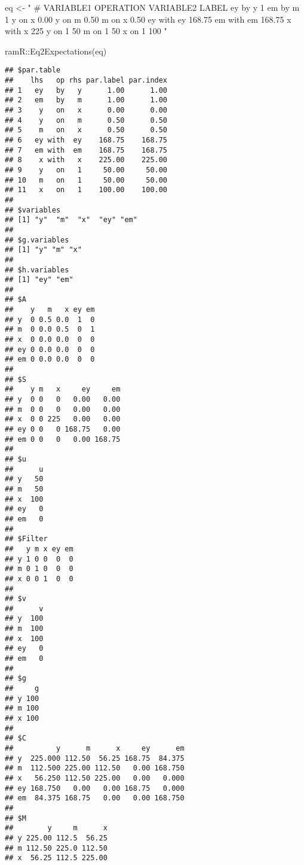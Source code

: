 \documentclass[
]{book}
\newenvironment{Shaded}{\begin{snugshade}}{\end{snugshade}}
\newcommand{\FunctionTok}[1]{\textcolor[rgb]{0.00,0.00,0.00}{#1}}
\newcommand{\NormalTok}[1]{#1}
\newcommand{\OtherTok}[1]{\textcolor[rgb]{0.56,0.35,0.01}{#1}}
\newcommand{\SpecialCharTok}[1]{\textcolor[rgb]{0.00,0.00,0.00}{#1}}
\newcommand{\StringTok}[1]{\textcolor[rgb]{0.31,0.60,0.02}{#1}}
\theoremstyle{definition}
\theoremstyle{definition}
\theoremstyle{definition}
\theoremstyle{remark}
\begin{document}
\begin{Shaded}
\begin{Highlighting}[]
\NormalTok{eq }\OtherTok{\textless{}{-}} \StringTok{"}
\StringTok{  \# VARIABLE1 OPERATION VARIABLE2 LABEL}
\StringTok{  ey          by        y         1}
\StringTok{  em          by        m         1}
\StringTok{  y           on        x         0.00}
\StringTok{  y           on        m         0.50}
\StringTok{  m           on        x         0.50}
\StringTok{  ey          with      ey        168.75}
\StringTok{  em          with      em        168.75}
\StringTok{  x           with      x         225}
\StringTok{  y           on        1         50}
\StringTok{  m           on        1         50}
\StringTok{  x           on        1         100}
\StringTok{"}
\end{Highlighting}
\end{Shaded}

\begin{Shaded}
\begin{Highlighting}[]
\NormalTok{ramR}\SpecialCharTok{::}\FunctionTok{Eq2Expectations}\NormalTok{(eq)}
\end{Highlighting}
\end{Shaded}

\begin{verbatim}
## $par.table
##    lhs   op rhs par.label par.index
## 1   ey   by   y      1.00      1.00
## 2   em   by   m      1.00      1.00
## 3    y   on   x      0.00      0.00
## 4    y   on   m      0.50      0.50
## 5    m   on   x      0.50      0.50
## 6   ey with  ey    168.75    168.75
## 7   em with  em    168.75    168.75
## 8    x with   x    225.00    225.00
## 9    y   on   1     50.00     50.00
## 10   m   on   1     50.00     50.00
## 11   x   on   1    100.00    100.00
## 
## $variables
## [1] "y"  "m"  "x"  "ey" "em"
## 
## $g.variables
## [1] "y" "m" "x"
## 
## $h.variables
## [1] "ey" "em"
## 
## $A
##    y   m   x ey em
## y  0 0.5 0.0  1  0
## m  0 0.0 0.5  0  1
## x  0 0.0 0.0  0  0
## ey 0 0.0 0.0  0  0
## em 0 0.0 0.0  0  0
## 
## $S
##    y m   x     ey     em
## y  0 0   0   0.00   0.00
## m  0 0   0   0.00   0.00
## x  0 0 225   0.00   0.00
## ey 0 0   0 168.75   0.00
## em 0 0   0   0.00 168.75
## 
## $u
##      u
## y   50
## m   50
## x  100
## ey   0
## em   0
## 
## $Filter
##   y m x ey em
## y 1 0 0  0  0
## m 0 1 0  0  0
## x 0 0 1  0  0
## 
## $v
##      v
## y  100
## m  100
## x  100
## ey   0
## em   0
## 
## $g
##     g
## y 100
## m 100
## x 100
## 
## $C
##          y      m      x     ey      em
## y  225.000 112.50  56.25 168.75  84.375
## m  112.500 225.00 112.50   0.00 168.750
## x   56.250 112.50 225.00   0.00   0.000
## ey 168.750   0.00   0.00 168.75   0.000
## em  84.375 168.75   0.00   0.00 168.750
## 
## $M
##        y     m      x
## y 225.00 112.5  56.25
## m 112.50 225.0 112.50
## x  56.25 112.5 225.00
\end{verbatim}
\end{document}
